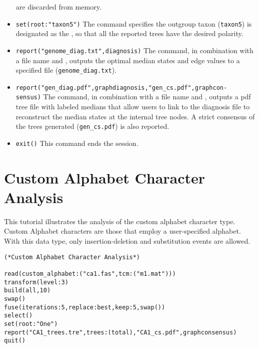 \begin{itemize}
are discarded from memory.  
\item \texttt{set(root:"taxon5")} The  command 
specifies the outgroup taxon (\texttt{taxon5}) is designated as the 
, so that all the reported trees have the desired polarity.  
\item \texttt{report("genome\_diag.txt",diagnosis)} The 
command, in combination with a file name and 
 , outputs the optimal median states and
 edge values to a specified file (\texttt{genome\_diag.txt}).
\item \texttt{report("gen\_diag.pdf",graphdiagnosis,"gen\_cs.pdf",graphcon-\\sensus)}
The  command, in combination with a file name
and , outputs a pdf tree file with
labeled medians that allow users to link to the diagnosis file to
reconstruct the median states at the internal tree nodes. A strict
consensus of the trees generated (\texttt{gen\_cs.pdf}) is also
reported.  
\item \texttt{exit()} This command ends the \poy session.
\end{itemize}


\section{Custom Alphabet Character Analysis}{\label{tutorial12}}

This tutorial illustrates the analysis of the custom alphabet character type.  
Custom Alphabet characters are those that employ a user-specified alphabet. 
With this data type, only insertion-deletion and substitution events are allowed.

\begin{verbatim}
(*Custom Alphabet Character Analysis*)

read(custom_alphabet:("ca1.fas",tcm:("m1.mat")))
transform(level:3)
build(all,10)
swap()
fuse(iterations:5,replace:best,keep:5,swap())
select()
set(root:"One")
report("CA1_trees.tre",trees:(total),"CA1_cs.pdf",graphconsensus)
quit()
\end{verbatim}

